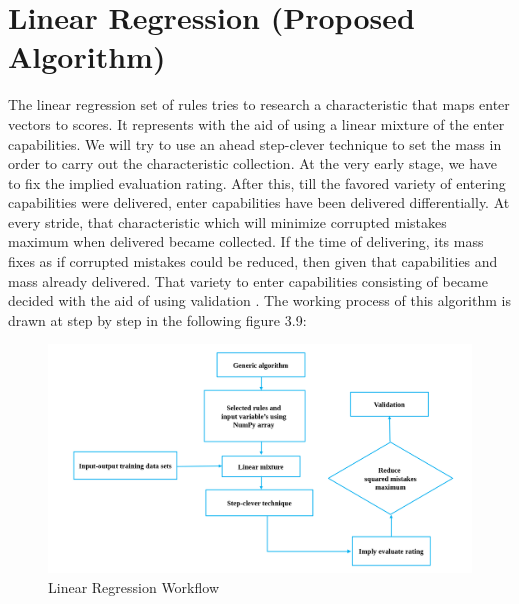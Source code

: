 \section{Linear Regression (Proposed Algorithm)}
The linear regression set of rules tries to research a characteristic that maps enter vectors to scores. It represents with the aid of using a linear mixture of the enter capabilities. We will try to use an ahead step-clever technique to set the mass in order to carry out the characteristic collection. At the very early stage, we have to fix the implied evaluation rating. After this, till the favored variety of entering capabilities were delivered, enter capabilities have been delivered differentially. At every stride, that characteristic which will minimize corrupted mistakes maximum when delivered became collected. If the time of delivering, its mass fixes as if corrupted mistakes could be reduced, then given that capabilities and mass already delivered. That variety to enter capabilities consisting of became decided with the aid of using validation \cite{bhardwaj2015sentiment}. The working process of this algorithm is drawn at step by step in the following figure 3.9:
\begin{figure}[H]
    \centering
    \includegraphics[scale=.3]{img3/Linear Regression Workflow.png}
    \caption{Linear Regression Workflow}
    \label{fig:LR Workflow}
\end{figure}
